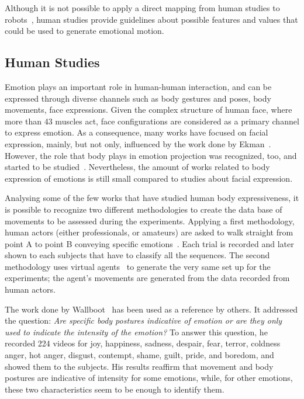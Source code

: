 
Although it is not possible to apply a direct mapping from human studies to robots~\cite{Saerbeck2007,Canamero2010}, human studies provide guidelines about possible features and values that could be used to generate emotional motion. 
 
\subsection{Human Studies}

Emotion plays an important role in human-human interaction, and can be expressed through diverse channels such as body gestures and poses, body movements, face expressions. Given the complex structure of human face, where more than 43 muscles act, face configurations are considered as a primary channel to express emotion. As a consequence, many works have focused on facial expression, mainly, but not only, influenced by the work done by Ekman~\cite{Ekman2004}. However, the role that body plays in emotion projection was recognized, too, and started to be studied~\cite{Gelder2008,Wallboot1998}. Nevertheless, the amount of works related to body expression of emotions is still small compared to studies about facial expression. 

Analysing some of the few works that have studied human body expressiveness, it is possible to recognize two different methodologies to create the data base of movements to be assessed during the experiments. Applying a first methodology, human actors (either professionals, or amateurs) are asked to walk straight from point A to point B conveying specific emotions~\cite{Dael2012,Meijer1989,Wallboot1998}. Each trial is recorded and later shown to each subjects that have to classify all the sequences. The second methodology uses virtual agents~\cite{Roether2009,Venture2014} to generate the very same set up for the experiments; the agent's movements are generated from the data recorded from human actors.

The work done by Wallboot~\cite{Wallboot1998} has been used as a reference by others. It addressed the question: \textit{Are specific body postures indicative of emotion or are they only used to indicate the intensity of the emotion?} To answer this question, he recorded 224 videos for joy, happiness, sadness, despair, fear, terror, coldness anger, hot anger, disgust, contempt, shame, guilt, pride, and boredom, and showed them to the subjects. His results reaffirm that movement and body postures are indicative of intensity for some emotions, while, for other emotions, these two characteristics seem to be enough to identify them. %

